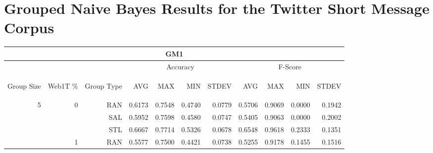 \chapter{Grouped Naive Bayes Results for the Twitter Short Message Corpus}

\begin{center}
\begin{table}[htbp]
\begin{tabular}{ | r | r | r | r | r | r | r | r | r | r | r |}
\hline
\multicolumn{11}{|c|}{GM1}\\
\hline
 & & & \multicolumn{4}{|c|}{Accuracy} & \multicolumn{4}{|c|}{F-Score}\\ \cline{4-11}
\begin{sideways}Group Size\end{sideways} & \begin{sideways}Web1T \%\end{sideways} & \begin{sideways}Group Type\end{sideways} & \begin{sideways}AVG\end{sideways} & \begin{sideways}MAX\end{sideways} & \begin{sideways}MIN\end{sideways} & \begin{sideways}STDEV\end{sideways} & \begin{sideways}AVG\end{sideways} & \begin{sideways}MAX\end{sideways} & \begin{sideways}MIN\end{sideways} & \begin{sideways}STDEV\end{sideways}\\
\hline
\multirow{18}{*}{5}
 & \multirow{3}{*}{0} & RAN & 0.6173 & 0.7548 & 0.4740 & 0.0779 & 0.5706 & 0.9069 & 0.0000 & 0.1942\\ \cline{3-11}
 &   & SAL & 0.5952 & 0.7598 & 0.4580 & 0.0747 & 0.5405 & 0.9063 & 0.0000 & 0.2002\\ \cline{3-11}
 &   & STL & 0.6667 & 0.7714 & 0.5326 & 0.0678 & 0.6548 & 0.9618 & 0.2333 & 0.1351\\ \cline{2-11}
 & \multirow{3}{*}{1} & RAN & 0.5577 & 0.7500 & 0.4421 & 0.0738 & 0.5255 & 0.9178 & 0.1455 & 0.1516\\ \cline{3-11}

\end{tabular}
\end{table}
\end{center}
